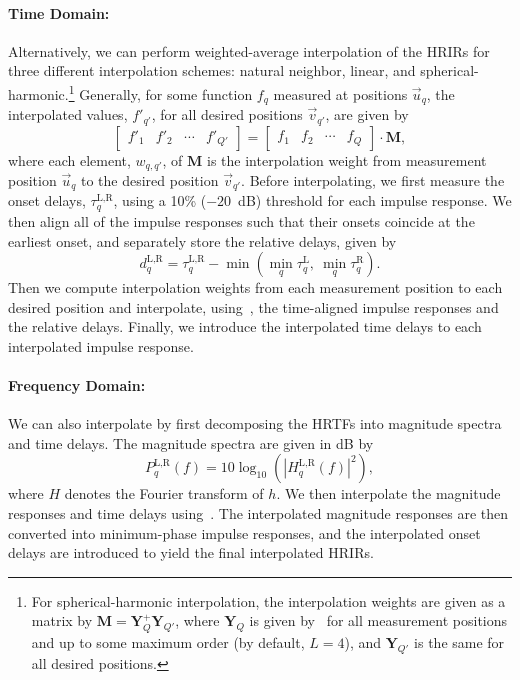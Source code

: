 \paragraph*{Time Domain:} Alternatively, we can perform weighted-average interpolation of the HRIRs for three different interpolation schemes:
natural neighbor, linear, and spherical-harmonic.\footnote{For spherical-harmonic interpolation, the interpolation weights are given as a matrix by $\mathbf{M} = \mathbf{Y}_Q^+ \mathbf{Y}_{Q'}$, where $\mathbf{Y}_Q$ is given by~ for all measurement positions and up to some maximum order (by default, $L = 4$), and $\mathbf{Y}_{Q'}$ is the same for all desired positions.}
Generally, for some function $f_q$ measured at positions $\vec{u}_q$, the interpolated values, $f'_{q'}$, for all desired positions $\vec{v}_{q'}$, are given by
\begin{equation}\label{eq:interpolation}
\begin{bmatrix} f'_1 & f'_2 & \cdots & f'_{Q'} \end{bmatrix} =
\begin{bmatrix} f_1 & f_2 & \cdots & f_{Q} \end{bmatrix} \cdot \mathbf{M},
\end{equation}
where each element, $w_{q,q'}$, of $\mathbf{M}$ is the interpolation weight from measurement position $\vec{u}_q$ to the desired position $\vec{v}_{q'}$.
Before interpolating, we first measure the onset delays, $\tau_q^\text{L,R}$, using a 10\% ($-20$~dB) threshold for each impulse response.
We then align all of the impulse responses such that their onsets coincide at the earliest onset, 
and separately store the relative delays, given by
\begin{equation}
d_q^\text{L,R} = \tau_q^\text{L,R} - \min \left( \min_q \tau_q^\text{L},~ \min_q \tau_q^\text{R} \right).
\end{equation}
Then we compute interpolation weights from each measurement position to each desired position and interpolate,
using~, the time-aligned impulse responses and the relative delays.
Finally, we introduce the interpolated time delays to each interpolated impulse response.

\paragraph*{Frequency Domain:} We can also interpolate by first decomposing the HRTFs into magnitude spectra and time delays.
The magnitude spectra are given in dB by
\begin{equation}
P_q^\text{L,R}(f) = 10 \log_{10} \left( \left| H_q^\text{L,R}(f) \right|^2 \right),
\end{equation}
where $H$ denotes the Fourier transform of $h$.
We then interpolate the magnitude responses and time delays using~.
The interpolated magnitude responses are then converted into minimum-phase impulse responses,
and the interpolated onset delays are introduced to yield the final interpolated HRIRs.

